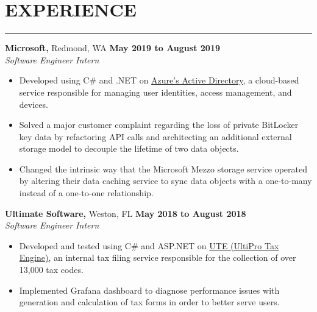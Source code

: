 \section*{EXPERIENCE}

\hrule \relax
\sectionheaderspace

\noindent \textbf{Microsoft,} Redmond, WA \hfill\textbf{May 2019 to August 2019}\\
\textit{Software Engineer Intern}
\begin{itemize}[noitemsep,nolistsep, label = {-}]
	\item Developed using C\# and .NET on \href{https://docs.microsoft.com/en-us/azure/active-directory/fundamentals/active-directory-whatis}{Azure's Active Directory}, a cloud-based service responsible for managing user identities, access management, and devices.
	\item Solved a major customer complaint regarding the loss of private BitLocker key data by refactoring API calls and architecting an additional external storage model to decouple the lifetime of two data objects.
	\item Changed the intrinsic way that the Microsoft Mezzo storage service operated by altering their data caching service to sync data objects with a one-to-many instead of a one-to-one relationship.
\end{itemize}
\subsectionspace

\noindent \textbf{Ultimate Software,} Weston, FL \hfill\textbf{May 2018 to August 2018}\\
\textit{Software Engineer Intern}
\begin{itemize}[noitemsep,nolistsep, label = {-}]
	\item Developed and tested using C\# and ASP.NET on \href{https://www.ultimatesoftware.com/UltiPro-Solution-Features-Payment-Services}{UTE (UltiPro Tax Engine)}, an internal tax filing service responsible for the collection of over 13,000 tax codes.
	\item Implemented Grafana dashboard to diagnose performance issues with generation and calculation of tax forms in order to better serve users.
\end{itemize}
\subsectionspace